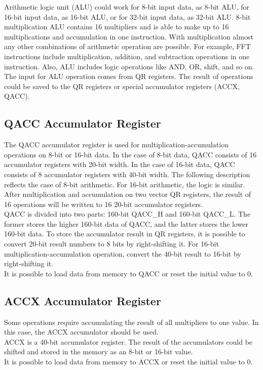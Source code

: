 \documentclass[main\_\_EN.tex]{subfiles}
\begin{document}
Arithmetic logic unit (ALU) could work for 8-bit input data, as 8-bit ALU, for 16-bit input data, as 16-bit ALU, or for 32-bit input data, as 32-bit ALU. 8-bit multiplication ALU contains 16 multipliers and is able to make up to 16 multiplications and accumulation in one instruction. With multiplication almost any other combinations of arithmetic operation are possible. For example, FFT instructions include multiplication, addition, and subtraction operations in one instruction. Also, ALU includes logic operations like AND, OR, shift, and so on.\\
The input for ALU operation comes from QR registers. The result of operations could be saved to the QR registers or special accumulator registers (ACCX, QACC).

\subsection{QACC Accumulator Register}

The QACC accumulator register is used for multiplication-accumulation operations on 8-bit or 16-bit data. In the case of 8-bit data, QACC consists of 16 accumulator registers with 20-bit width. In the case of 16-bit data, QACC consists of 8 accumulator registers with 40-bit width. The following description reflects the case of 8-bit arithmetic. For 16-bit arithmetic, the logic is similar.\\
After multiplication and accumulation on two vector QR registers, the result of 16 operations will be written to 16 20-bit accumulator registers. \\
QACC is divided into two parts: 160-bit QACC\_H and 160-bit QACC\_L. The former stores the higher 160-bit data of QACC, and the latter stores the lower 160-bit data. To store the accumulator result in QR registers, it is possible to convert 20-bit result numbers to 8 bits by right-shifting it. For 16-bit multiplication-accumulation operation, convert the 40-bit result to 16-bit by right-shifting it.\\
It is possible to load data from memory to QACC or reset the initial value to 0.

\subsection{ACCX Accumulator Register}

Some operations require accumulating the result of all multipliers to one value. In this case, the ACCX accumulator should be used.\\
ACCX is a 40-bit accumulator register. The result of the accumulators could be shifted and stored in the memory as an 8-bit or 16-bit value.\\
It is possible to load data from memory to ACCX or reset the initial value to 0.
\end{document}
